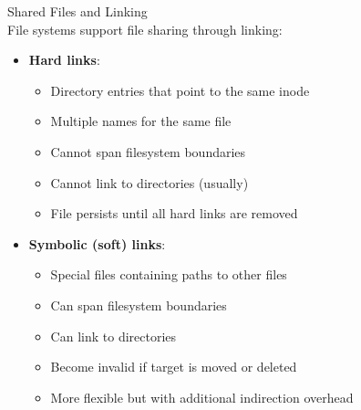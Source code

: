 \begin{definition}{Shared Files and Linking}\\
    File systems support file sharing through linking:
    \begin{itemize}
        \item \textbf{Hard links}:
            \begin{itemize}
                \item Directory entries that point to the same inode
                \item Multiple names for the same file
                \item Cannot span filesystem boundaries
                \item Cannot link to directories (usually)
                \item File persists until all hard links are removed
            \end{itemize}
        \item \textbf{Symbolic (soft) links}:
            \begin{itemize}
                \item Special files containing paths to other files
                \item Can span filesystem boundaries
                \item Can link to directories
                \item Become invalid if target is moved or deleted
                \item More flexible but with additional indirection overhead
            \end{itemize}
    \end{itemize}
\end{definition}

